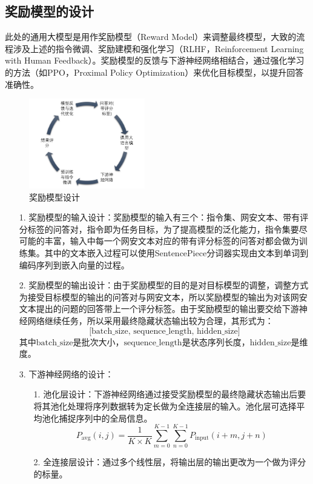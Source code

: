 \subsection{奖励模型的设计}
此处的通用大模型是用作奖励模型（Reward Model）来调整最终模型，大致的流程涉及上述的指令微调、奖励建模和强化学习（RLHF，Reinforcement Learning with Human Feedback）。奖励模型的反馈与下游神经网络相结合，通过强化学习的方法（如PPO\cite{Wang2024APT}，Proximal Policy Optimization）来优化目标模型，以提升回答准确性。
\begin{figure}[htbp]
    \centering
    \includegraphics[width=0.45\textwidth]{./img/rm.png}
    \caption{奖励模型设计}\label{fig:奖励模型设计}
\end{figure}
\begin{itemize}
    \item[1.]奖励模型的输入设计\cite{pmlr-v202-longpre23a}：奖励模型的输入有三个：指令集、网安文本、带有评分标签的问答对，指令即为任务目标，为了提高模型的泛化能力，指令集要尽可能的丰富，输入中每一个网安文本对应的带有评分标签的问答对都会做为训练集。其中的文本嵌入过程可以使用SentencePiece分词器实现由文本到单词到编码序列到嵌入向量的过程。
    \item[2.]奖励模型的输出设计：由于奖励模型的目的是对目标模型的调整，调整方式为接受目标模型的输出的问答对与网安文本，所以奖励模型的输出为对该网安文本提出的问题的回答带上一个评分标签。由于奖励模型的输出要交给下游神经网络继续任务，所以采用最终隐藏状态输出较为合理，其形式为：\[ \text{[batch\_size, sequence\_length,  hidden\_size]} \]
    其中$\text{batch\_size}$是批次大小，$\text{sequence\_length}$是状态序列长度，$\text{hidden\_size}$是维度。
    \item[3.] 下游神经网络的设计\cite{Chung2022ScalingIL}：
    \begin{itemize}
        \item[1.]池化层设计：下游神经网络通过接受奖励模型的最终隐藏状态输出后要将其池化处理将序列数据转为定长做为全连接层的输入。池化层可选择平均池化捕捉序列中的全局信息。
        \[P_{\text{avg}}(i, j) = \frac{1}{K \times K} \sum_{m=0}^{K-1} \sum_{n=0}^{K-1} P_{\text{input}}(i + m, j + n)\]
        \item[2.]全连接层设计：通过多个线性层，将输出层的输出更改为一个做为评分的标量。
    \end{itemize}
\end{itemize}

